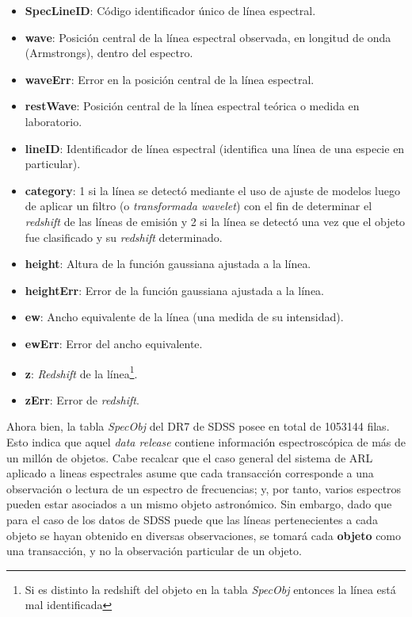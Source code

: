 \begin{itemize}
\item \textbf{SpecLineID}: Código identificador único de línea espectral.
\item \textbf{wave}: Posición central de la línea espectral observada, en longitud de onda (Armstrongs), dentro del espectro.
\item \textbf{waveErr}: Error en la posición central de la línea espectral.
\item \textbf{restWave}: Posición central de la línea espectral teórica o medida en laboratorio.
\item \textbf{lineID}: Identificador de línea espectral (identifica una línea de una especie en particular).
\item \textbf{category}: 1 si la línea se detectó mediante el uso de ajuste de modelos luego de aplicar un filtro (o \textit{transformada wavelet}) con el fin de determinar el \textit{redshift} de las líneas de emisión y 2 si la línea se detectó una vez que el objeto fue clasificado y su \textit{redshift} determinado.
\item \textbf{height}: Altura de la función gaussiana ajustada a la línea.
\item \textbf{heightErr}: Error de la función gaussiana ajustada a la línea.
\item \textbf{ew}: Ancho equivalente de la línea (una medida de su intensidad).
\item \textbf{ewErr}: Error del ancho equivalente.
\item \textbf{z}: \textit{Redshift} de la línea\footnote{Si es distinto la redshift del objeto en la tabla \textit{SpecObj} entonces la línea está mal identificada}.
\item \textbf{zErr}: Error de \textit{redshift}.
\end{itemize}

Ahora bien, la tabla \textit{SpecObj} del DR7 de SDSS posee en total de 1053144 filas. Esto indica que aquel \textit{data release} contiene información espectroscópica de más de un millón de objetos. Cabe recalcar que el caso general del sistema de ARL aplicado a lineas espectrales asume que cada transacción corresponde a una observación o lectura de un espectro de frecuencias; y, por tanto, varios espectros pueden estar asociados a un mismo objeto astronómico. Sin embargo, dado que para el caso de los datos de SDSS puede que las líneas pertenecientes a cada objeto se hayan obtenido en diversas observaciones, se tomará cada \textbf{objeto} como una transacción, y no la observación particular de un objeto.

